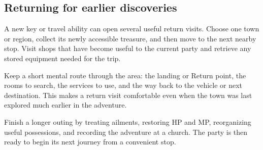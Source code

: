 \subsection*{Returning for earlier discoveries}

A new key or travel ability can open several useful return visits. Choose
one town or region, collect its newly accessible treasure, and then move
to the next nearby stop. Visit shops that have become useful to the
current party and retrieve any stored equipment needed for the trip.

Keep a short mental route through the area: the landing or Return point,
the rooms to search, the services to use, and the way back to the vehicle
or next destination. This makes a return visit comfortable even when the
town was last explored much earlier in the adventure.

Finish a longer outing by treating ailments, restoring HP and MP,
reorganizing useful possessions, and recording the adventure at a church.
The party is then ready to begin its next journey from a convenient stop.

